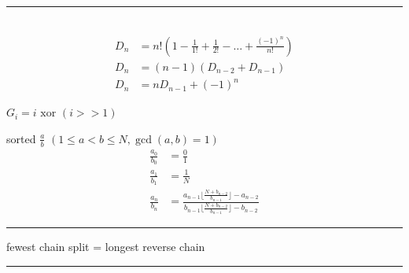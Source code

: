 \documentclass[10pt,letterpaper,landscape]{article}
\begin{document}
\begin{multicols}{2}
\noindent\rule{\linewidth}{1pt}

 \\
\begin{align*}
	D_n &= n! (1 - \frac{1}{1!} + \frac{1}{2!} - \hdots + \frac{(-1)^n}{n!}) \\
	D_n &= (n-1)(D_{n-2} + D_{n-1}) \\
	D_n &= n D_{n-1} + (-1)^n
\end{align*}

 $G_i = i \text{ xor } (i >> 1)$

 sorted $\frac{a}{b}$ $(1 \le a < b \le N, \gcd(a,b) = 1)$
\begin{align*}
	\frac{a_0}{b_0} &= \frac{0}{1} \\
	\frac{a_1}{b_1} &= \frac{1}{N} \\
	\frac{a_n}{b_n} &= \frac{a_{n-1} \lfloor \frac{N+b_{n-2}}{b_{n-1}} \rfloor - a_{n-2}}{b_{n-1} \lfloor \frac{N+b_{n-2}}{b_{n-1}} \rfloor - b_{n-2}}
\end{align*}

\noindent\rule{\linewidth}{1pt}

 fewest chain split = longest reverse chain

\noindent\rule{\linewidth}{1pt}

\end{multicols}
\end{document}
